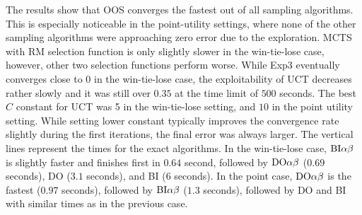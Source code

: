 The results show that OOS converges the fastest out of all sampling algorithms.
This is especially noticeable in the point-utility settings, where none of the other sampling algorithms were approaching zero error due to the exploration.
MCTS with RM selection function is only slightly slower in the win-tie-lose case, however, other two selection functions perform worse.
While Exp3 eventually converges close to $0$ in the win-tie-lose case, the exploitability of UCT decreases rather slowly and it was still over $0.35$ at the time limit of $500$ seconds.
The best $C$ constant for UCT was 5 in the win-tie-lose setting, and $10$ in the point utility setting.
While setting lower constant typically improves the convergence rate slightly during the first iterations, the final error was always larger.
The vertical lines represent the times for the exact algorithms.
In the win-tie-lose case, $\textrm{BI}\alpha\beta$ is slightly faster and finishes first in $0.64$ second, followed by $\textrm{DO}\alpha\beta$ ($0.69$ seconds), \textsc{DO} ($3.1$ seconds), and \textsc{BI} ($6$ seconds).
In the point case, $\textrm{DO}\alpha\beta$ is the fastest ($0.97$ seconds), followed by $\textrm{BI}\alpha\beta$ ($1.3$ seconds), followed by \textsc{DO} and \textsc{BI} with similar times as in the previous case.

